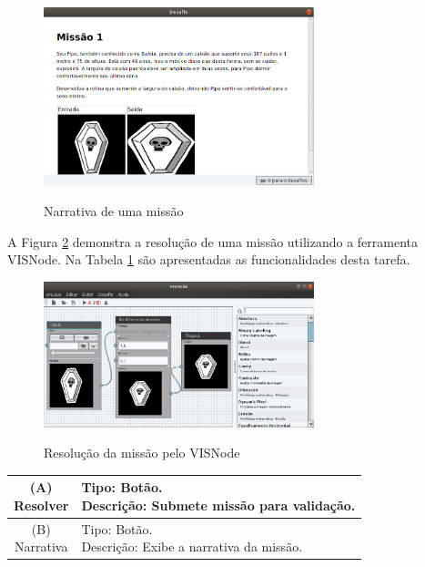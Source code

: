 \documentclass[
	12pt,				%
	oneside,			%
	a4paper,			%
	english,			%
	french,				%
	spanish,			%
	brazil,				%
	]{abntex2}
\begin{document}
\begin{figure}[H]
\centering
\caption{Narrativa de uma missão}
\includegraphics[width=0.7\textwidth]{imagens/visnode_missao_narrativa.png}
\sourceAuthor
\label{fig:visnodeMissaoNarrativa}
\end{figure}

A Figura \ref{fig:visnodeDesktop} demonstra a resolução de uma missão utilizando a ferramenta VISNode. Na Tabela \ref{tab:visnodeDesktop} são apresentadas as funcionalidades desta tarefa.

\begin{figure}[H]
\centering
\caption{Resolução da missão pelo VISNode}
\includegraphics[width=0.7\textwidth]{imagens/visnode_desktop.png}
\sourceAuthor
\label{fig:visnodeDesktop}
\end{figure}

\begin{table}[H]
\centering
{} \label{tab:visnodeDesktop}
\renewcommand{\arraystretch}{1.8}
\setlength{\tabcolsep}{10pt}
\begin{tabular}{|c|l|}
  \hline
  \makecell{(A) \\ Resolver} 
  &
  \makecell[l]{Tipo: Botão.\\ Descrição: Submete missão para validação.} \\
  \hline
  \makecell{(B) \\ Narrativa} 
  &
  \makecell[l]{Tipo: Botão.\\ Descrição: Exibe a narrativa da missão.} \\
  \hline
\end{tabular}
\centering
\sourceAuthor
\end{table}
\end{document}
